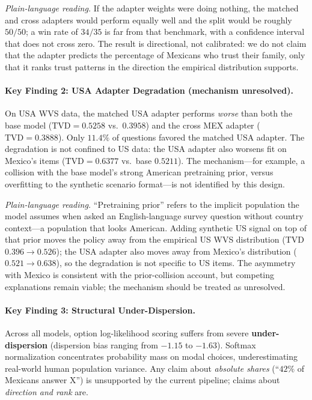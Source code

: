 \documentclass[11pt,letterpaper]{article}
\begin{document}
\emph{Plain-language reading.} If the adapter weights were doing nothing, the matched and cross adapters would perform equally well and the split would be roughly $50/50$; a win rate of $34/35$ is far from that benchmark, with a confidence interval that does not cross zero. The result is directional, not calibrated: we do not claim that the adapter predicts the percentage of Mexicans who trust their family, only that it ranks trust patterns in the direction the empirical distribution supports.

\paragraph{Key Finding 2: USA Adapter Degradation (mechanism unresolved).}
On USA WVS data, the matched USA adapter performs \emph{worse} than both the base model ($\text{TVD} = 0.5258$ vs.\ $0.3958$) and the cross MEX adapter ($\text{TVD} = 0.3888$). Only $11.4\%$ of questions favored the matched USA adapter. The degradation is not confined to US data: the USA adapter also worsens fit on Mexico's items ($\text{TVD} = 0.6377$ vs.\ base $0.5211$). The mechanism---for example, a collision with the base model's strong American pretraining prior, versus overfitting to the synthetic scenario format---is not identified by this design.

\emph{Plain-language reading.} ``Pretraining prior'' refers to the implicit population the model assumes when asked an English-language survey question without country context---a population that looks American. Adding synthetic US signal on top of that prior moves the policy away from the empirical US WVS distribution (TVD $0.396 \rightarrow 0.526$); the USA adapter also moves away from Mexico's distribution ($0.521 \rightarrow 0.638$), so the degradation is not specific to US items. The asymmetry with Mexico is consistent with the prior-collision account, but competing explanations remain viable; the mechanism should be treated as unresolved.

\paragraph{Key Finding 3: Structural Under-Dispersion.}
Across all models, option log-likelihood scoring suffers from severe \textbf{under-dispersion} (dispersion bias ranging from $-1.15$ to $-1.63$). Softmax normalization concentrates probability mass on modal choices, underestimating real-world human population variance. Any claim about \emph{absolute shares} (``$42\%$ of Mexicans answer X'') is unsupported by the current pipeline; claims about \emph{direction and rank} are.
\end{document}
